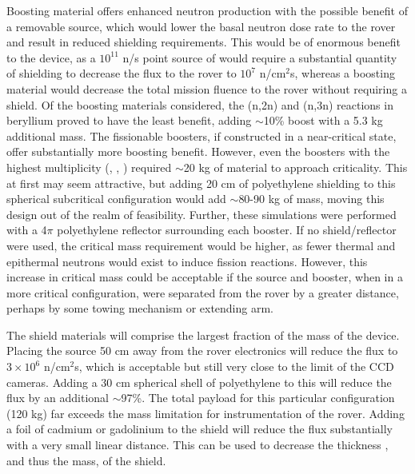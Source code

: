 \documentclass{mc2015}
\begin{document}
Boosting material offers enhanced neutron production with the possible benefit of a removable source, which would lower the basal neutron dose rate to the rover and result in reduced shielding requirements. This would be of enormous benefit to the device, as a $10^{11}$ n/s point source of  would require a substantial quantity of shielding to decrease the flux to the rover to $10^{7}$ n/cm$^2$s, whereas a boosting material would decrease the total mission fluence to the rover without requiring a shield. Of the boosting materials considered, the (n,2n) and (n,3n) reactions in beryllium proved to have the least benefit, adding $\sim$10\% boost with a 5.3 kg additional mass. The fissionable boosters, if constructed in a near-critical state, offer substantially more boosting benefit. However, even the boosters with the highest multiplicity (, , ) required $\sim$20 kg of material to approach criticality. This at first may seem attractive, but adding 20 cm of polyethylene shielding to this spherical subcritical configuration would add $\sim$80-90 kg of mass, moving this design out of the realm of feasibility. Further, these simulations were performed with a 4$\pi$ polyethylene reflector surrounding each booster. If no shield/reflector were used, the critical mass requirement would be higher, as fewer thermal and epithermal neutrons would exist to induce fission reactions. However, this increase in critical mass could be acceptable if the source and booster, when in a more critical configuration, were separated from the rover by a greater distance, perhaps by some towing mechanism or extending arm. 

The shield materials will comprise the largest fraction of the mass of the device. Placing the source 50 cm away from the rover electronics will reduce the flux to $3 \times 10^6$ n/cm$^2$s, which is acceptable but still very close to the limit of the CCD cameras. Adding a 30 cm spherical shell of polyethylene to this will reduce the flux by an additional $\sim$97\%. The total payload for this particular configuration (120 kg) far exceeds the mass limitation for instrumentation of the rover.  Adding a foil of cadmium or gadolinium to the shield will reduce the flux substantially with a very small linear distance. This can be used to decrease the thickness , and thus the mass, of the shield.
\end{document}
